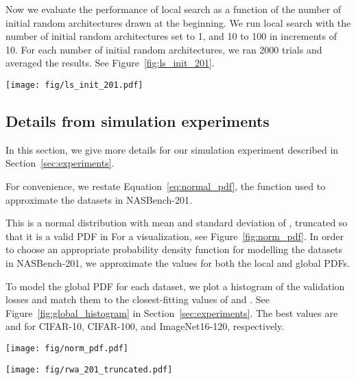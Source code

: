 \documentclass[11pt]{article}
\numberwithin{equation}{section}
\numberwithin{figure}{section}
\theoremstyle{plain}
\theoremstyle{definition}
\begin{document}
Now we evaluate the performance of local search as a function of the number
of initial random architectures drawn at the beginning.
We run local search with the number of initial random architectures set to 1, 
and 10 to 100 in increments of 10. For each number of initial random architectures,
we ran 2000 trials and averaged the results.
See Figure~\ref{fig:ls_init_201}.

\begin{figure*}
\centering \texttt{[image: fig/ls\_init\_201.pdf]}
\caption{
Results for local search performance vs.\ number of inital randomly drawn architectures
on NASBench-201 for CIFAR-10 (left), CIFAR-100 (middle),
and ImageNet-16-120 (right).
}
\label{fig:ls_init_201}
\end{figure*}



\subsection{Details from simulation experiments}

In this section, we give more details for our simulation experiment
described in Section~\ref{sec:experiments}.


For convenience, we restate Equation~\ref{eq:normal_pdf}, the function used to approximate
the datasets in NASBench-201.

This is a normal distribution with mean  
and standard deviation of , truncated so that it is a valid PDF
in 
For a visualization, see Figure~\ref{fig:norm_pdf}.
In order to choose an appropriate probability density function for modelling the
datasets in NASBench-201, we approximate the  values for
both the local and global PDFs.

To model the global PDF for each dataset,
we plot a histogram of the validation losses and match them to the closest-fitting
values of  and .
See Figure~\ref{fig:global_histogram} in Section~\ref{sec:experiments}.
The best values are  and  for CIFAR-10, CIFAR-100, 
and ImageNet16-120, respectively.



\begin{figure*}
\centering \texttt{[image: fig/norm\_pdf.pdf]}
\caption{
Normal PDF from Equation~\ref{eq:normal_pdf} plotted with three values of .
}
\label{fig:norm_pdf}
\end{figure*}



\begin{figure*}
\centering \texttt{[image: fig/rwa\_201\_truncated.pdf]}
\caption{
RWA vs.\ distance for three datasets in NASBench-201, as well as three values of 
 in Equation~\ref{eq:normal_pdf}.
Since a random walk reaches a mean distance of  after  steps,
we plot the -axis as the square root as the autocorrelation
shift, similar to prior work~\cite{nasbench}. 
}
\label{fig:rwa}
\end{figure*}
\end{document}
